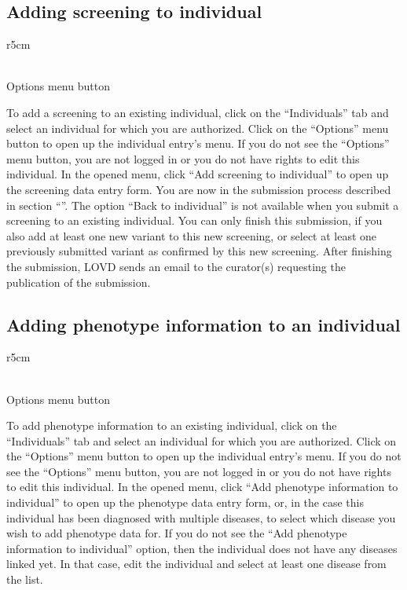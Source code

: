 \subsection{Adding screening to individual}
\begin{wrapfigure}[4]{r}{5cm} %
  \vspace{-25pt}
  \begin{framed}
    \\Options menu button
  \end{framed}
\end{wrapfigure}
To add a screening to an existing individual, click on the ``Indivi\-duals'' tab and select an individual for
 which you are authorized.
Click on the ``Options'' menu button to open up the individual entry's menu.
If you do not see the ``Options'' menu button, you are not logged in or you do not have rights to edit this
 individual.
In the opened menu, click ``Add screening to individual'' to open up the screening data entry form.
You are now in the submission process described in section ``''.
The option ``Back to individual'' is not available when you submit a screening to an existing  individual.
You can only finish this submission, if you also add at least one new variant to this new screening,
 or select at least one previously submitted variant as confirmed by this new screening.
After finishing the submission, LOVD sends an email to the curator(s) requesting the publication of the submission.



\subsection{Adding phenotype information to an individual}
\label{ssec:add_phenotype}
\begin{wrapfigure}[4]{r}{5cm} %
  \vspace{-25pt}
  \begin{framed}
    \\Options menu button
  \end{framed}
\end{wrapfigure}
To add phenotype information to an existing individual, click on the ``Individuals'' tab and select an individual for
 which you are authorized.
Click on the ``Options'' menu button to open up the individual entry's menu.
If you do not see the ``Options'' menu button, you are not logged in or you do not have rights to edit this
 individual.
In the opened menu, click ``Add phenotype information to individual'' to open up the phenotype data entry form,
 or, in the case this individual has been diagnosed with multiple diseases,
 to select which disease you wish to add phenotype data for.
If you do not see the ``Add phenotype information to individual'' option,
 then the individual does not have any diseases linked yet.
In that case, edit the individual and select at least one disease from the list.

